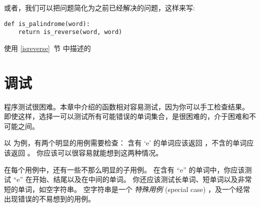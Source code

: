 或者，我们可以把问题简化为之前已经解决的问题，这样来写:


\begin{lstlisting}
def is_palindrome(word):
    return is_reverse(word, word)
\end{lstlisting}


使用 \ref{isreverse}~节 中描述的 


\section{调试}
    


程序测试很困难。本章中介绍的函数相对容易测试，因为你可以手工检查结果。
即使这样，选择一可以测试所有可能错误的单词集合，是很困难的，介于困难和不可能之间。


以  为例，有两个明显的用例需要检查：
含有 `e' 的单词应该返回 ，不含的单词应该返回  。
你应该可以很容易就能想到这两种情况。


在每个用例中，还有一些不那么明显的子用例。
在含有 ``e'' 的单词中，你应该测试 ``e'' 在开始、结尾以及在中间的单词。
你还应该测试长单词、短单词以及非常短的单词，如空字符串。
空字符串是一个 {\em 特殊用例} (special case) ，及一个经常出现错误的不易想到的用例。

